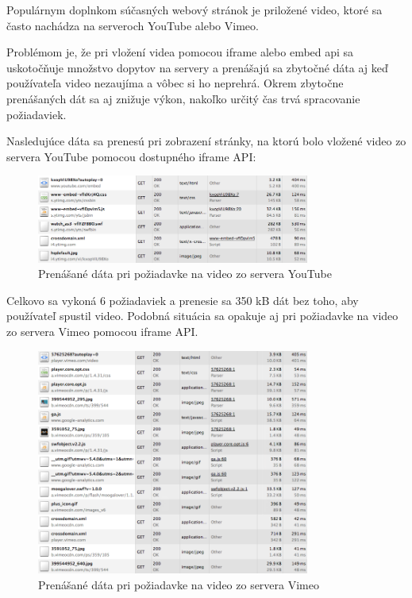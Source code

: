 Populárnym doplnkom súčasných webový stránok je priložené video, ktoré sa často nachádza na serveroch YouTube alebo Vimeo.

Problémom je, že pri vložení videa pomocou iframe alebo embed api sa uskotočňuje množstvo dopytov na servery a prenášajú sa zbytočné dáta aj keď používateľa video nezaujíma a vôbec si ho neprehrá. Okrem zbytočne prenášaných dát sa aj znižuje výkon, nakoľko určitý čas trvá spracovanie požiadaviek.

Nasledujúce dáta sa prenesú pri zobrazení stránky, na ktorú bolo vložené video zo servera YouTube pomocou dostupného iframe API:

\begin{figure}[H]
	\centering
	\includegraphics[width=0.8\textwidth]{img/youtube.png}
	\caption[Prenášané dáta pri požiadavke na video zo servera YouTube]{
		Prenášané dáta pri požiadavke na video zo servera YouTube}
	\label{fig: youtube}
\end{figure}

Celkovo sa vykoná 6 požiadaviek a prenesie sa 350 kB dát bez toho, aby používateľ spustil video. Podobná situácia sa opakuje aj pri požiadavke na video zo servera Vimeo pomocou iframe API.

\begin{figure}[H]
	\centering
	\includegraphics[width=0.8\textwidth]{img/vimeo.png}
	\caption[Prenášané dáta pri požiadavke na video zo servera Vimeo]{
		Prenášané dáta pri požiadavke na video zo servera Vimeo}
	\label{fig: vimeo}
\end{figure}

